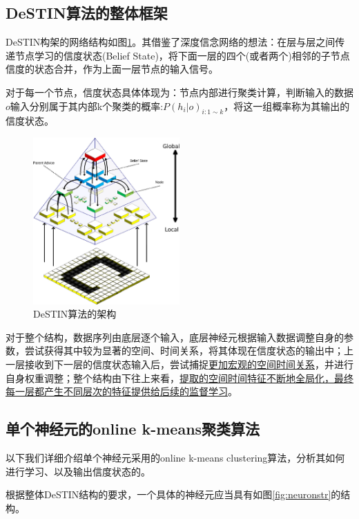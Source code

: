 \subsection{DeSTIN算法的整体框架}

DeSTIN构架的网络结构如图\ref{fig:destinarchi}。其借鉴了深度信念网络的想法：在层与层之间传递节点学习的信度状态(Belief State)，将下面一层的四个(或者两个)相邻的子节点信度的状态合并，作为上面一层节点的输入信号。

对于每一个节点，信度状态具体体现为：节点内部进行聚类计算，判断输入的数据$o$输入分别属于其内部k个聚类的概率:${P(h_i|o)}_{i:1\sim k}$，将这一组概率称为其输出的信度状态。

\begin{figure}[htbp]
   \centering
   \includegraphics[width=0.5\textwidth]{DeSTINArchitecture.png} %
   \caption{DeSTIN算法的架构}
   \label{fig:destinarchi}
\end{figure}

对于整个结构，数据序列由底层逐个输入，底层神经元根据输入数据调整自身的参数，尝试获得其中较为显著的空间、时间关系，将其体现在信度状态的输出中；上一层接收到下一层的信度状态输入后，尝试捕捉\uline{更加宏观的空间时间关系}，并进行自身权重调整；整个结构由下往上来看，\uline{提取的空间时间特征不断地全局化，最终每一层都产生不同层次的特征提供给后续的监督学习}。

\subsection{单个神经元的online k-means聚类算法}
以下我们详细介绍单个神经元采用的online k-means clustering算法，分析其如何进行学习、以及输出信度状态的。

根据整体DeSTIN结构的要求，一个具体的神经元应当具有如图\ref{fig:neuronstr}的结构。

